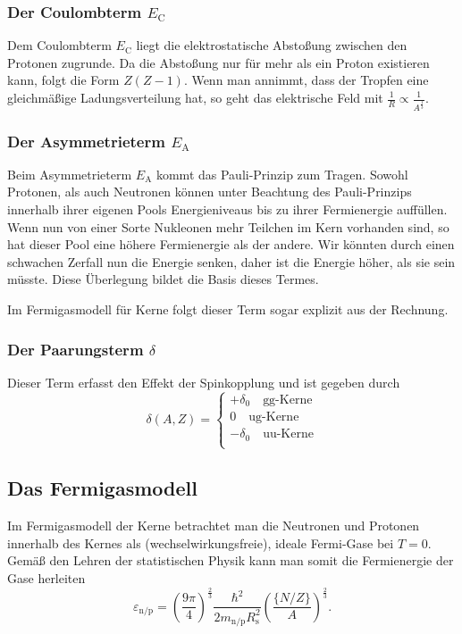 \subsubsection{Der Coulombterm $E_\text{C}$}
Dem Coulombterm $E_\text{C}$ liegt die elektrostatische Abstoßung zwischen den Protonen zugrunde.
Da die Abstoßung nur für mehr als ein Proton existieren kann, folgt die Form $Z(Z-1)$.
Wenn man annimmt, dass der Tropfen eine gleichmäßige Ladungsverteilung hat, so geht das elektrische Feld mit $\frac{1}{R}\propto\frac{1}{A^\frac{1}{3}}$.

\subsubsection{Der Asymmetrieterm $E_\text{A}$}
Beim Asymmetrieterm $E_\text{A}$ kommt das Pauli-Prinzip zum Tragen.
Sowohl Protonen, als auch Neutronen können unter Beachtung des Pauli-Prinzips innerhalb ihrer eigenen Pools Energieniveaus bis zu ihrer Fermienergie auffüllen.
Wenn nun von einer Sorte Nukleonen mehr Teilchen im Kern vorhanden sind, so hat dieser Pool eine höhere Fermienergie als der andere.
Wir könnten durch einen schwachen Zerfall nun die Energie senken, daher ist die Energie höher, als sie sein müsste.
Diese Überlegung bildet die Basis dieses Termes.

Im Fermigasmodell für Kerne folgt dieser Term sogar explizit aus der Rechnung.

\subsubsection{Der Paarungsterm $\delta$}
Dieser Term erfasst den Effekt der Spinkopplung und ist gegeben durch
\begin{equation*}
	\delta(A,Z) = \begin{cases}
									+\delta_0\quad\text{gg-Kerne} \\
									0 \quad\text{ug-Kerne} \\
									-\delta_0\quad\text{uu-Kerne} \\
								\end{cases}
\end{equation*}

\subsection{Das Fermigasmodell}
Im Fermigasmodell der Kerne betrachtet man die Neutronen und Protonen innerhalb des Kernes als (wechselwirkungsfreie), ideale Fermi-Gase bei $T=0$.
Gemäß den Lehren der statistischen Physik kann man somit die Fermienergie der Gase herleiten
\begin{equation*}
	\varepsilon_\text{n/p} = \left(\frac{9\pi}{4}\right)^\frac{2}{3} \frac{\hbar^2}{2m_\text{n/p}R_\text{s}^2}\left(\frac{\{N/Z\}}{A}\right)^\frac{2}{3}.
\end{equation*}

